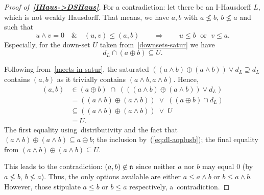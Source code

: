 \begin{proof}[Proof of~{\bf \ref{IHaus->DSHaus}}]
  For a contradiction: let there be an I-Hausdorff $L$, which is not weakly
  Hausdorff.
  That means, we have $a, b$ with $a \not\leq b, \, b \not\leq a$ and such that
  \[
    u \wedge v = 0 \quad \& \quad \left(u, v\right) \leq \left(a, b\right)
    \qquad \Longrightarrow \qquad
    u \leq b \; \textrm{ or } \; v \leq a.
  \]
  Especially, for the down-set $U$ taken from~\ref{downsets-satur} we have
  \begin{equation} \label{eq:dl-aoplusb}
    d_L \cap (a \oplus b) \subseteq U.
  \end{equation}

  Following from~\ref{meets-in-satur}, the saturated $(\left(a \wedge b\right)
  \oplus \left(a \wedge b\right)) \vee d_L \supseteq d_L$ contains $(a, b)$
  as it trivially contains $\left( a \wedge b, a \wedge b \right)$.
  Hence,
  \begin{align*}
    (a, b) &\in (a \oplus b) \; \cap \; (((a \wedge b) \oplus (a \wedge b))
            \vee d_L) \\
           &= ((a \wedge b) \oplus (a \wedge b)) \; \vee \; ((a \oplus b) \cap
               d_L) \\
           &\subseteq ((a \wedge b) \oplus (a \wedge b)) \; \vee \; U \\
           &= U.
  \end{align*}
  The first equality using~distributivity and the fact that $(a \wedge b)
  \oplus (a \wedge b) \subseteq a \oplus b$;
  the inclusion by~(\ref{eq:dl-aoplusb});
  the final equality from $(a \wedge b) \oplus (a \wedge b) \subseteq U$.

  This leads to the contradiction:
  $(a, b)\not\in \mathfrak{n}$ since neither $a$ nor $b$ may equal $0$ (by $a \not\leq b,
  \, b \not\leq a$).
  Thus, the only options available are either $a \leq a \wedge b$ or $b \leq a
  \wedge b$.
  However, those stipulate $a \leq b$ or $b \leq a$ respectively,
  a~contradiction. 
\end{proof}
